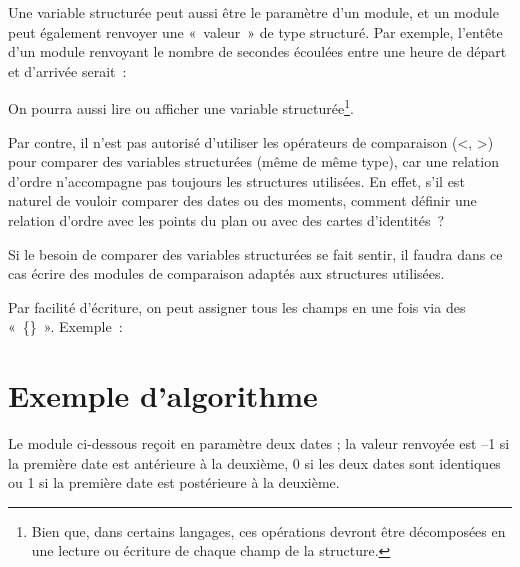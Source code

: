 	Une variable structurée peut aussi être le
	paramètre d’un module, et un module peut également renvoyer une
	«~valeur~» de type structuré. Par exemple, l’entête d’un module
	renvoyant le nombre de secondes écoulées entre une heure de départ et
	d’arrivée serait~:


	On pourra aussi lire ou afficher une variable structurée\footnote{Bien que, dans certains
	langages, ces opérations devront être décomposées en une lecture ou
	écriture de chaque champ de la structure.}.


	Par contre, il n’est pas autorisé d’utiliser
	les opérateurs de comparaison ({\textless}, {\textgreater}) pour
	comparer des variables structurées (même de même type), car une
	relation d’ordre n’accompagne pas toujours les structures utilisées. En
	effet, s’il est naturel de vouloir comparer des dates ou des moments,
	comment définir une relation d’ordre avec les points du plan ou avec
	des cartes d’identités~?

	Si le besoin de comparer des variables
	structurées se fait sentir, il faudra dans ce cas écrire des modules de
	comparaison adaptés aux structures utilisées.

	Par facilité d’écriture, on peut assigner tous les champs en une 
	fois via des «~\{\}~». Exemple~:


\section{Exemple d’algorithme}

	Le module ci-dessous reçoit en paramètre deux dates ; la valeur renvoyée
	est –1 si la première date est antérieure à la deuxième, 0 si les deux
	dates sont identiques ou 1 si la première date est postérieure à la
	deuxième.

